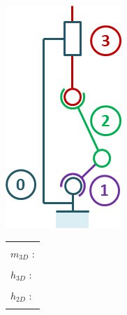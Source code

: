 \documentclass[10pt,fleqn]{article} %
\begin{document}
\begin{multicols}{2}
\begin{minipage}[c]{.45\linewidth}
\begin{center}
\includegraphics[width=.8\linewidth]{images/cas_12.png}
\end{center}
\end{minipage} \hfill
\begin{minipage}[c]{.5\linewidth}
\begin{center}
\begin{tabular}{|p{3cm}|}
\hline 
\\
$m_{3D}$ : \\
\\
$h_{3D}$ : \\
\\
$h_{2D}$ : \\
\\
\hline
\end{tabular}
\end{center}
\end{minipage}


\end{multicols}
\end{document}
